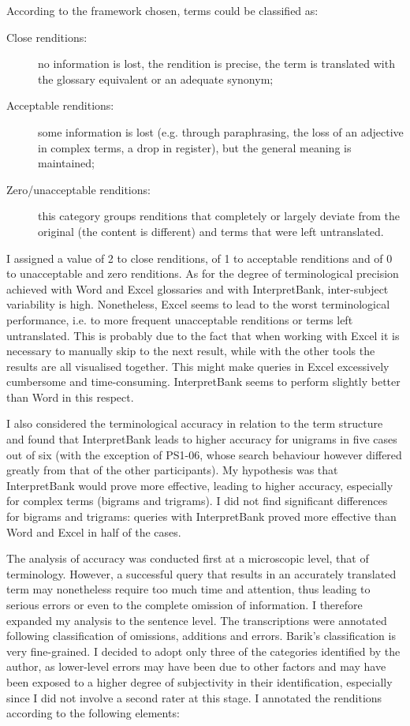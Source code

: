 According to the framework chosen, terms could be classified as:

\begin{description}
    \item[Close renditions:] no information is lost, the rendition is precise, the term is translated with the glossary equivalent or an adequate synonym;
    \item[Acceptable renditions:] some information is lost (e.g. through paraphrasing, the loss of an adjective in complex terms, a drop in register), but the general meaning is maintained;
    \item[Zero/unacceptable renditions:] this category groups renditions that completely or largely deviate from the original (the content is different) and terms that were left untranslated.
\end{description}
I assigned a value of 2 to close renditions, of 1 to acceptable renditions and of 0 to unacceptable and zero renditions. As for the degree of terminological precision achieved with Word and Excel glossaries and with InterpretBank, inter-subject variability is high. Nonetheless, Excel seems to lead to the worst terminological performance, i.e. to more frequent unacceptable renditions or terms left untranslated. This is probably due to the fact that when working with Excel it is necessary to manually skip to the next result, while with the other tools the results are all visualised together. This might make queries in Excel excessively cumbersome and time-consuming. InterpretBank seems to perform slightly better than Word in this respect.

I also considered the terminological accuracy in relation to the term structure and found that InterpretBank leads to higher accuracy for unigrams in five cases out of six (with the exception of PS1-06, whose search behaviour however differed greatly from that of the other participants). My hypothesis was that InterpretBank would prove more effective, leading to higher accuracy, especially for complex terms (bigrams and trigrams). I did not find significant differences for bigrams and trigrams: queries with InterpretBank proved more effective than Word and Excel in half of the cases.

The analysis of accuracy was conducted first at a microscopic level, that of terminology. However, a successful query that results in an accurately translated term may nonetheless require too much time and attention, thus leading to serious errors or even to the complete omission of information. I therefore expanded my analysis to the sentence level. The transcriptions were annotated following  classification of omissions, additions and errors. Barik's classification is very fine-grained. I decided to adopt only three of the categories identified by the author, as lower-level errors may have been due to other factors and may have been exposed to a higher degree of subjectivity in their identification, especially since I did not involve a second rater at this stage. I annotated the renditions according to the following elements:

